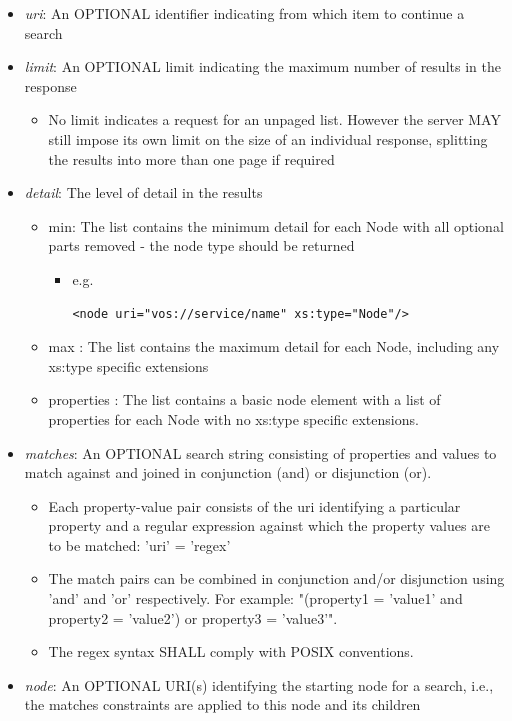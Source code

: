 \documentclass[11pt,a4paper]{ivoa}
\begin{document}
\begin{itemize}
    \item \emph{uri}: An OPTIONAL identifier indicating from which item to continue a search
    \item \emph{limit}: An OPTIONAL limit indicating the maximum number of results in the response
        \begin{itemize}
            \item No limit indicates a request for an unpaged list. However the server MAY still impose its own limit on the size of an individual response, splitting the results into more than one page if required
        \end{itemize}
    \item \emph{detail}: The level of detail in the results
        \begin{itemize}
            \item min: The list contains the minimum detail for each Node with all optional parts removed - the node type should be returned
                \begin{itemize}
                    \item e.g. \begin{verbatim}<node uri="vos://service/name" xs:type="Node"/>\end{verbatim}
                \end{itemize}
            \item max : The list contains the maximum detail for each Node, including any xs:type specific extensions
            \item properties : The list contains a basic node element with a list of properties for each Node with no xs:type specific extensions.
        \end{itemize}
    \item \emph{matches}: An OPTIONAL search string consisting of properties and values to match against and joined in conjunction (and) or disjunction (or).
        \begin{itemize}
            \item Each property-value pair consists of the uri identifying a particular property and a regular expression against which the property values are to be matched: 'uri' = 'regex'
            \item The match pairs can be combined in conjunction and/or disjunction using 'and' and 'or' respectively. For example: "(property1 = 'value1' and property2 = 'value2') or property3 = 'value3'".
            \item The regex syntax SHALL comply with POSIX conventions.
        \end{itemize}
    \item \emph{node}: An OPTIONAL URI(s) identifying the starting node for a search, i.e., the matches constraints are applied to this node and its children
\end{itemize}
\end{document}
